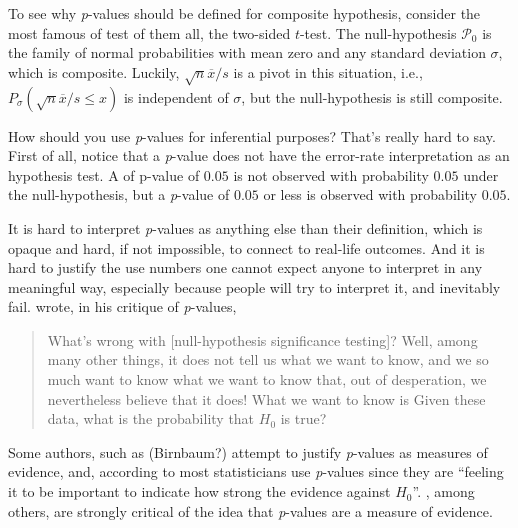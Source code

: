 To see why \emph{p}-values should be defined for composite hypothesis,
consider the most famous of test of them all, the two-sided $t$-test.
The null-hypothesis $\mathcal{P}_{0}$ is the family of normal probabilities
with mean zero and any standard deviation $\sigma$, which is composite.
Luckily, $\sqrt{n}\overline{x}/s$ is a pivot in this situation, i.e.,
$P_{\sigma}(\sqrt{n}\overline{x}/s\leq x)$ is independent of $\sigma$,
but the null-hypothesis is still composite. 

How should you use \emph{p}-values for inferential purposes? That's
really hard to say. First of all, notice that a \emph{p}-value does
not have the error-rate interpretation as an hypothesis test. A of
p-value of $0.05$ is not observed with probability $0.05$ under
the null-hypothesis, but a \emph{p}-value of $0.05$ or less is observed
with probability $0.05$. 

It is hard to interpret \emph{p}-values as anything else than their
definition, which is opaque and hard, if not impossible, to connect
to real-life outcomes. And it is hard to justify the use numbers one
cannot expect anyone to interpret in any meaningful way, especially
because people will try to interpret it, and inevitably fail. \cite{Cohen1994-au}
wrote, in his critique of \emph{p}-values, 
\begin{verse}
What's wrong with {[}null-hypothesis significance testing{]}? Well,
among many other things, it does not tell us what we want to know,
and we so much want to know what we want to know that, out of desperation,
we nevertheless believe that it does! What we want to know is \textquotedbl Given
these data, what is the probability that $H_{0}$ is true?\textquotedbl{}
\end{verse}
Some authors, such as (Birnbaum?) attempt to justify \emph{p}-values
as measures of evidence, and, according to \cite{Berger1987-tf}
most statisticians use \emph{p}-values since they are ``feeling it
to be important to indicate how strong the evidence against $H_{0}$''.
\cite{Hubbard2008-cg}, among others, are strongly critical of the
idea that \emph{p}-values are a measure of evidence.

